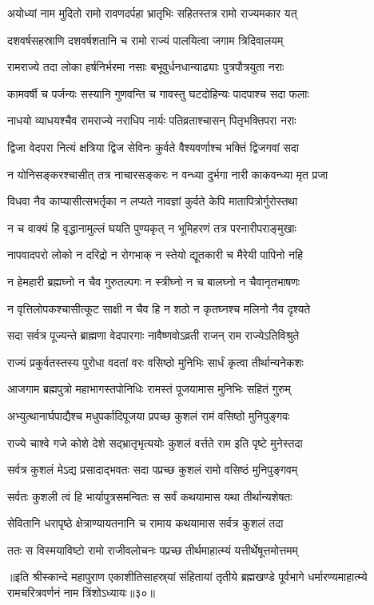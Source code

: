 \twolineshloka
{अयोध्यां नाम मुदितो रामो रावणदर्पहा}
{भ्रातृभिः सहितस्तत्र रामो राज्यमकार यत्}%

\twolineshloka
{दशवर्षसहस्राणि दशवर्षशतानि च}
{रामो राज्यं पालयित्वा जगाम त्रिदिवालयम्}%

\twolineshloka
{रामराज्ये तदा लोका हर्षनिर्भरमा नसाः}
{बभूवुर्धनधान्याढ्याः पुत्रपौत्रयुता नराः}%

\twolineshloka
{कामवर्षी च पर्जन्यः सस्यानि गुणवन्ति च}
{गावस्तु घटदोहिन्यः पादपाश्च सदा फलाः}%

\twolineshloka
{नाधयो व्याधयश्चैव रामराज्ये नराधिप}
{नार्यः पतिव्रताश्चासन् पितृभक्तिपरा नराः}%

\twolineshloka
{द्विजा वेदपरा नित्यं क्षत्रिया द्विज सेविनः}
{कुर्वते वैश्यवर्णाश्च भक्तिं द्विजगवां सदा}%

\twolineshloka
{न योनिसङ्करश्चासीत् तत्र नाचारसङ्करः}
{न वन्ध्या दुर्भगा नारी काकवन्ध्या मृत प्रजा}%

\twolineshloka
{विधवा नैव काप्यासीत्सभर्तृका न लप्यते}
{नावज्ञां कुर्वते केपि मातापित्रोर्गुरोस्तथा}%

\twolineshloka
{न च वाक्यं हि वृद्धानामुल्लं घयति पुण्यकृत्}
{न भूमिहरणं तत्र परनारीपराङ्मुखाः}%

\twolineshloka
{नापवादपरो लोको न दरिद्रो न रोगभाक्}
{न स्तेयो द्यूतकारी च मैरेयी पापिनो नहि}%

\twolineshloka
{न हेमहारी ब्रह्मघ्नो न चैव गुरुतल्पगः}
{न स्त्रीघ्नो न च बालघ्नो न चैवानृतभाषणः}%

\twolineshloka
{न वृत्तिलोपकश्चासीत्कूट साक्षी न चैव हि}
{न शठो न कृतघ्नश्च मलिनो नैव दृश्यते}%

\twolineshloka
{सदा सर्वत्र पूज्यन्ते ब्राह्मणा वेदपारगाः}
{नावैष्णवोऽव्रती राजन् राम राज्येऽतिविश्रुते}%

\twolineshloka
{राज्यं प्रकुर्वतस्तस्य पुरोधा वदतां वरः}
{वसिष्ठो मुनिभिः सार्धं कृत्वा तीर्थान्यनेकशः}%

\twolineshloka
{आजगाम ब्रह्मपुत्रो महाभागस्तपोनिधिः}
{रामस्तं पूजयामास मुनिभिः सहितं गुरुम्}%

\twolineshloka
{अभ्युत्थानार्घपाद्यैश्च मधुपर्कादिपूजया}
{प्रपच्छ कुशलं रामं वसिष्ठो मुनिपुङ्गवः}%

\twolineshloka
{राज्ये चाश्वे गजे कोशे देशे सद्भ्रातृभृत्ययोः}
{कुशलं वर्त्तते राम इति पृष्टे मुनेस्तदा}%


\twolineshloka
{सर्वत्र कुशलं मेऽद्य प्रसादाद्भवतः सदा}
{पप्रच्छ कुशलं रामो वसिष्ठं मुनिपुङ्गवम्}%

\twolineshloka
{सर्वतः कुशली त्वं हि भार्यापुत्रसमन्वितः}
{स सर्वं कथयामास यथा तीर्थान्यशेषतः}%

\twolineshloka
{सेवितानि धरापृष्ठे क्षेत्राण्यायतनानि च}
{रामाय कथयामास सर्वत्र कुशलं तदा}%

\twolineshloka
{ततः स विस्मयाविष्टो रामो राजीवलोचनः}
{पप्रच्छ तीर्थमाहात्म्यं यत्तीर्थेषूत्तमोत्तमम्}%

॥इति श्रीस्कान्दे महापुराण एकाशीतिसाहस्र्यां संहितायां तृतीये ब्रह्मखण्डे पूर्वभागे धर्मारण्यमाहात्म्ये रामचरित्रवर्णनं नाम त्रिंशोऽध्यायः॥३०॥
